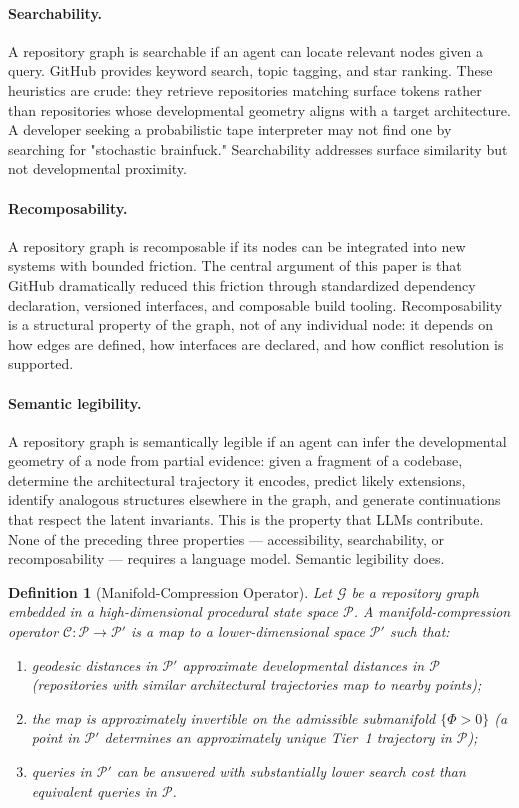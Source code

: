 \documentclass[11pt]{article}
\newtheorem{definition}[theorem]{Definition}
\begin{document}
\paragraph{Searchability.}
A repository graph is searchable if an agent can locate relevant nodes given
a query. GitHub provides keyword search, topic tagging, and star ranking.
These heuristics are crude: they retrieve repositories matching surface
tokens rather than repositories whose developmental geometry aligns with
a target architecture. A developer seeking a probabilistic tape interpreter
may not find one by searching for "stochastic brainfuck." Searchability
addresses surface similarity but not developmental proximity.

\paragraph{Recomposability.}
A repository graph is recomposable if its nodes can be integrated into new
systems with bounded friction. The central argument of this paper is that
GitHub dramatically reduced this friction through standardized dependency
declaration, versioned interfaces, and composable build tooling. Recomposability
is a structural property of the graph, not of any individual node: it depends
on how edges are defined, how interfaces are declared, and how conflict
resolution is supported.

\paragraph{Semantic legibility.}
A repository graph is semantically legible if an agent can infer the
developmental geometry of a node from partial evidence: given a fragment of
a codebase, determine the architectural trajectory it encodes, predict likely
extensions, identify analogous structures elsewhere in the graph, and generate
continuations that respect the latent invariants. This is the property that
LLMs contribute. None of the preceding three properties --- accessibility,
searchability, or recomposability --- requires a language model. Semantic
legibility does.

\begin{definition}[Manifold-Compression Operator]
Let $\mathcal{G}$ be a repository graph embedded in a high-dimensional
procedural state space $\mathcal{P}$. A \emph{manifold-compression operator}
$\mathcal{C} : \mathcal{P} \to \mathcal{P}'$ is a map to a lower-dimensional
space $\mathcal{P}'$ such that:
\begin{enumerate}
\item geodesic distances in $\mathcal{P}'$ approximate developmental distances
in $\mathcal{P}$ (repositories with similar architectural trajectories map to
nearby points);
\item the map is approximately invertible on the admissible submanifold
$\{\Phi > 0\}$ (a point in $\mathcal{P}'$ determines an approximately unique
Tier~1 trajectory in $\mathcal{P}$);
\item queries in $\mathcal{P}'$ can be answered with substantially lower
search cost than equivalent queries in $\mathcal{P}$.
\end{enumerate}
\end{definition}
\end{document}
